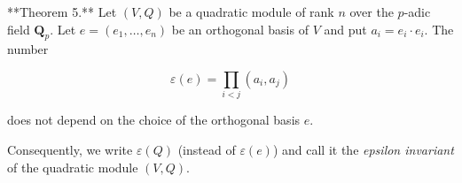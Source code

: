 **Theorem 5.** Let $(V,Q)$ be a quadratic module of rank $n$ over the $p$-adic field $\mathbf{Q}_p$. Let $e = (e_1,\ldots,e_n)$ be an orthogonal basis of $V$ and put $a_i = e_i \cdot e_i$. The number

$$\varepsilon(e) = \prod_{i < j} (a_i, a_j)$$

does not depend on the choice of the orthogonal basis $e$.

Consequently, we write $\varepsilon(Q)$ (instead of $\varepsilon(e)$) and call it the \emph{epsilon invariant} of the quadratic module $(V,Q)$.
